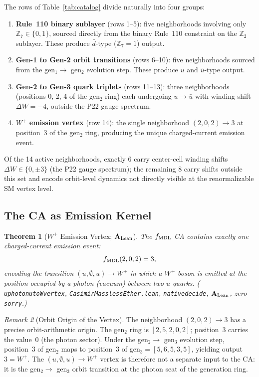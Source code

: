\documentclass[11pt]{article}
\newtheorem{theorem}{Theorem}[section]
\theoremstyle{remark}
\newtheorem{remark}[theorem]{Remark}
\newcommand{\lean}[1]{%
  \penalty-100
  \begingroup\def\_{\textunderscore\allowbreak}\texttt{#1}\endgroup}
\newcommand{\CatAL}{\ensuremath{\textbf{A}_{\rm Lean}}}
\begin{document}
The rows of Table~\ref{tab:catalog} divide naturally into four groups:
\begin{enumerate}[nosep,leftmargin=1.5em]
\item \textbf{Rule~110 binary sublayer} (rows 1--5): five neighborhoods
  involving only $\mathbb{Z}_7 \in \{0,1\}$, sourced directly from the
  binary Rule~110 constraint on the $\mathbb{Z}_2$ sublayer.
  These produce $\bar d$-type ($\mathbb{Z}_7 = 1$) output.
\item \textbf{Gen-1 to Gen-2 orbit transitions} (rows 6--10): five neighborhoods
  sourced from the gen$_1 \to$ gen$_2$ evolution step.
  These produce $u$ and $\bar u$-type output.
\item \textbf{Gen-2 to Gen-3 quark triplets} (rows 11--13): three neighborhoods
  (positions 0, 2, 4 of the gen$_2$ ring) each undergoing $u \to \bar u$
  with winding shift $\Delta W = -4$, outside the P22 gauge spectrum.
\item \textbf{$W^+$ emission vertex} (row 14): the single neighborhood
  $(2,0,2) \to 3$ at position~3 of the gen$_2$ ring, producing the
  unique charged-current emission event.
\end{enumerate}

Of the 14 active neighborhoods, exactly 6 carry center-cell winding shifts
$\Delta W \in \{0, \pm 3\}$ (the P22 gauge spectrum); the remaining
8 carry shifts outside this set and encode orbit-level dynamics not
directly visible at the renormalizable SM vertex level.

\subsection{The CA as Emission Kernel}
\label{sec:emission_kernel}

\begin{theorem}[$W^+$ Emission Vertex; $\CatAL$]
\label{thm:w_emission}
The $f_{\rm MDL}$ CA contains exactly one charged-current emission event:
\begin{equation}
  f_{\rm MDL}(2, 0, 2) = 3,
  \label{eq:w_emission}
\end{equation}
encoding the transition $(u, \emptyset, u) \to W^+$ in which a
$W^+$ boson is emitted at the position occupied by a photon (vacuum)
between two $u$-quarks.
(\lean{u\_photon\_u\_to\_W\_vertex}, \texttt{CasimirMasslessEther.lean},
\lean{native\_decide}, $\CatAL$, zero \texttt{sorry}.)
\end{theorem}

\begin{remark}[Orbit Origin of the Vertex]
The neighborhood $(2,0,2) \to 3$ has a precise orbit-arithmetic origin.
The gen$_2$ ring is $[2,5,2,0,2]$; position~3 carries the value~$0$
(the photon sector).
Under the gen$_2 \to$ gen$_3$ evolution step, position~3 of gen$_2$
maps to position~3 of gen$_3 = [5,6,5,3,5]$, yielding output~$3 = W^+$.
The $(u, \emptyset, u) \to W^+$ vertex is therefore not a separate input
to the CA: it is the gen$_2 \to$ gen$_3$ orbit transition at the photon
seat of the generation ring.
\end{remark}
\end{document}

